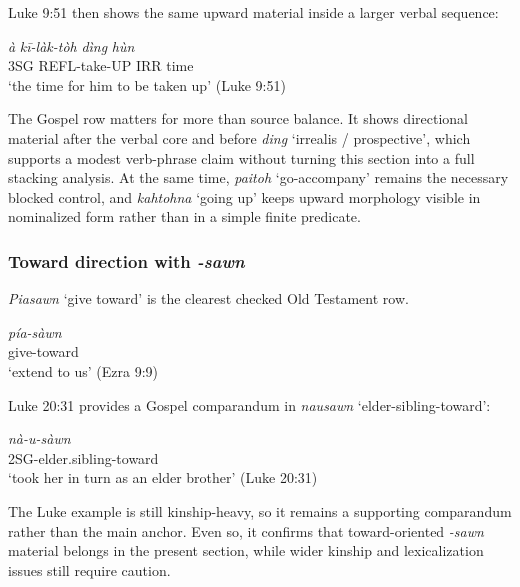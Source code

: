 \documentclass[
  11pt,
  a4paper,
]{article}
\newcommand{\tdim}[1]{\textit{#1}}
\newcommand{\tdimword}[1]{\textit{#1}}
\renewcommand{\textsc}[1]{{\footnotesize\MakeUppercase{#1}}}
\newcommand{\glossquote}[1]{`#1'}
\begin{document}
Luke 9:51 then shows the same upward material inside a larger verbal
sequence:

\begin{exe}
\ex \label{ex:dir-kilaktoh-luke9}
\gll \tdimword{à} \tdimword{kī-làk-tòh} \tdimword{dìng} \tdimword{hùn} \\
     \textsc{3sg} \textsc{refl}-take-\textsc{up} \textsc{irr} time \\
\glt \glossquote{the time for him to be taken up} (Luke 9:51)
\end{exe}

The Gospel row matters for more than source balance. It shows
directional material after the verbal core and before \tdim{ding}
\glossquote{irrealis / prospective}, which supports a modest verb-phrase
claim without turning this section into a full stacking analysis. At the
same time, \tdim{paitoh} \glossquote{go-accompany} remains the necessary
blocked control, and \tdim{kahtohna} \glossquote{going up} keeps upward
morphology visible in nominalized form rather than in a simple finite
predicate.

\subsubsection{\texorpdfstring{Toward direction with
\tdim{-sawn}}{Toward direction with }}\label{toward-direction-with}

\tdim{Piasawn} \glossquote{give toward} is the clearest checked Old
Testament row.

\begin{exe}
\ex \label{ex:dir-piasawn}
\gll \tdimword{pía-sàwn} \\
     give-toward \\
\glt \glossquote{extend to us} (Ezra 9:9)
\end{exe}

Luke 20:31 provides a Gospel comparandum in \tdim{nausawn}
\glossquote{elder-sibling-toward}:

\begin{exe}
\ex \label{ex:dir-nausawn}
\gll \tdimword{nà-u-sàwn} \\
     \textsc{2sg}-elder.sibling-toward \\
\glt \glossquote{took her in turn as an elder brother} (Luke 20:31)
\end{exe}

The Luke example is still kinship-heavy, so it remains a supporting
comparandum rather than the main anchor. Even so, it confirms that
toward-oriented \tdim{-sawn} material belongs in the present section,
while wider kinship and lexicalization issues still require caution.
\end{document}
